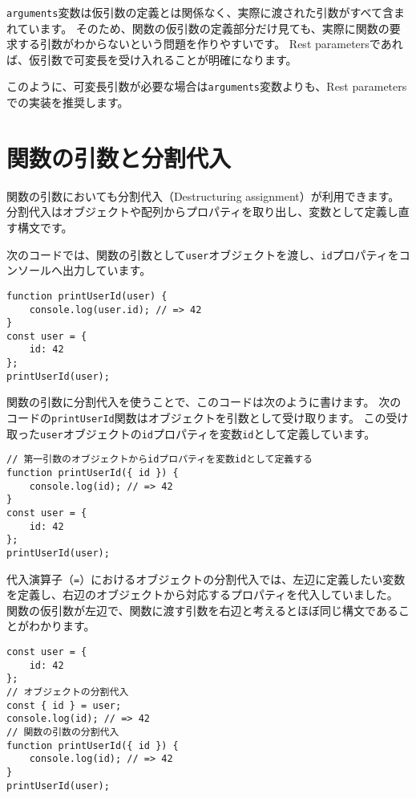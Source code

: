 \texttt{arguments}変数は仮引数の定義とは関係なく、実際に渡された引数がすべて含まれています。
そのため、関数の仮引数の定義部分だけ見ても、実際に関数の要求する引数がわからないという問題を作りやすいです。
Rest parametersであれば、仮引数で可変長を受け入れることが明確になります。

このように、可変長引数が必要な場合は\texttt{arguments}変数よりも、Rest
parametersでの実装を推奨します。

\hypertarget{function-destructuring}{%
\section[関数の引数と分割代入]{関数の引数と分割代入\,\protect{}}\label{function-destructuring}}

関数の引数においても分割代入（Destructuring assignment）が利用できます。
分割代入はオブジェクトや配列からプロパティを取り出し、変数として定義し直す構文です。

次のコードでは、関数の引数として\texttt{user}オブジェクトを渡し、\texttt{id}プロパティをコンソールへ出力しています。

\begin{lstlisting}
function printUserId(user) {
    console.log(user.id); // => 42
}
const user = {
    id: 42
};
printUserId(user);
\end{lstlisting}

関数の引数に分割代入を使うことで、このコードは次のように書けます。
次のコードの\texttt{printUserId}関数はオブジェクトを引数として受け取ります。
この受け取った\texttt{user}オブジェクトの\texttt{id}プロパティを変数\texttt{id}として定義しています。

\begin{lstlisting}
// 第一引数のオブジェクトからidプロパティを変数idとして定義する
function printUserId({ id }) {
    console.log(id); // => 42
}
const user = {
    id: 42
};
printUserId(user);
\end{lstlisting}

代入演算子（\texttt{=}）におけるオブジェクトの分割代入では、左辺に定義したい変数を定義し、右辺のオブジェクトから対応するプロパティを代入していました。
関数の仮引数が左辺で、関数に渡す引数を右辺と考えるとほぼ同じ構文であることがわかります。

\begin{lstlisting}
const user = {
    id: 42
};
// オブジェクトの分割代入
const { id } = user;
console.log(id); // => 42
// 関数の引数の分割代入
function printUserId({ id }) {
    console.log(id); // => 42
}
printUserId(user);
\end{lstlisting}

